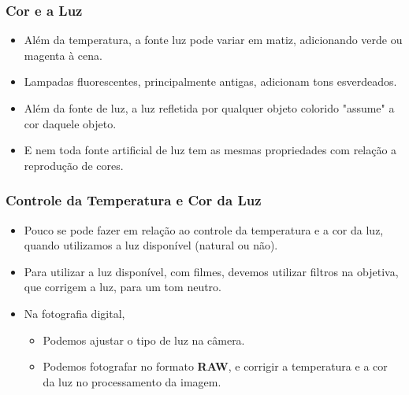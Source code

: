 
\begin{frame}
    \frametitle{Cor e a Luz}
    \begin{itemize}
      \item Além da temperatura, a fonte luz pode variar em matiz, adicionando verde ou magenta
      à cena.
      \item Lampadas fluorescentes, principalmente antigas, adicionam tons esverdeados.
      \item Além da fonte de luz, a luz refletida por qualquer objeto colorido "assume" a cor
      daquele objeto.
      \item E nem toda fonte artificial de luz tem as mesmas propriedades com relação a
      reprodução de cores.
    \end{itemize}
\end{frame}





\begin{frame}
    \frametitle{\Large{Controle da Temperatura e Cor da Luz}}
    \begin{itemize}
      \item Pouco se pode fazer em relação ao controle da temperatura e a cor da luz,
      quando utilizamos a luz disponível (natural ou não).
      \item Para utilizar a luz disponível, com filmes, devemos utilizar filtros
      na objetiva, que corrigem a luz, para um tom neutro.
      \item Na fotografia digital,
        \begin{itemize}
          \item Podemos ajustar o tipo de luz na câmera.
          \item Podemos fotografar no formato \textbf{RAW}, e
          corrigir a temperatura e a cor da luz no processamento da imagem.
        \end{itemize}
    \end{itemize}
\end{frame}

